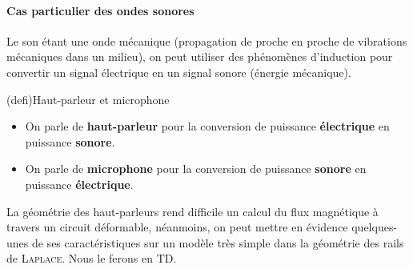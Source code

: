 \documentclass[../../main/main.tex]{subfiles}
\begin{document}
\paragraph*{Cas particulier des ondes sonores} Le son étant une onde mécanique
(propagation de proche en proche de vibrations mécaniques dans un milieu), on
peut utiliser des phénomènes d'induction pour convertir un signal électrique en
un signal sonore (énergie mécanique).

\begin{tcb*}(defi){Haut-parleur et microphone}
	\begin{itemize}
		\item On parle de \textbf{haut-parleur} pour la conversion de puissance
		      \textbf{électrique} en puissance \textbf{sonore}.
		\item On parle de \textbf{microphone} pour la conversion de
		      puissance \textbf{sonore} en puissance \textbf{électrique}.
	\end{itemize}
\end{tcb*}

La géométrie des haut-parleurs rend difficile un calcul du flux magnétique à
travers un circuit déformable, néanmoins, on peut mettre en évidence
quelques-unes de ses caractéristiques sur un modèle très simple dans la
géométrie des rails de \textsc{Laplace}. Nous le ferons en TD.
\end{document}
